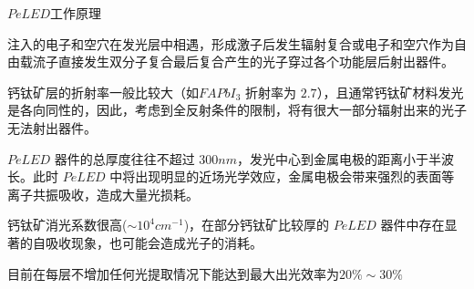 \documentclass{beamer}[fontset=windows]
\begin{document}
\begin{frame}
	\begin{block}{$PeLED$工作原理}
		\begin{itemize}\small{
			\item 注入的电子和空穴在发光层中相遇，形成激子后发生辐射复合或电子和空穴作为自由载流子直接发生双分子复合最后复合产生的光子穿过各个功能层后射出器件。
			\item 钙钛矿层的折射率一般比较大（如$FAPbI_{3}$ 折射率为 $2.7$），且通常钙钛矿材料发光是各向同性的，因此，考虑到全反射条件的限制，将有很大一部分辐射出来的光子无法射出器件。
			\item $PeLED$ 器件的总厚度往往不超过 $300 nm$，发光中心到金属电极的距离小于半波长。此时 $PeLED$ 中将出现明显的近场光学效应，金属电极会带来强烈的表面等离子共振吸收，造成大量光损耗。
			\item 钙钛矿消光系数很高($\sim 10^{4}cm^{-1}$)，在部分钙钛矿比较厚的 $PeLED$ 器件中存在显著的自吸收现象，也可能会造成光子的消耗\cite{cho2020role}。 
			\item 目前在每层不增加任何光提取情况下能达到最大出光效率为$20\%\sim 30\%$
		}
		\end{itemize}
	\end{block}
\end{frame}
\end{document}
